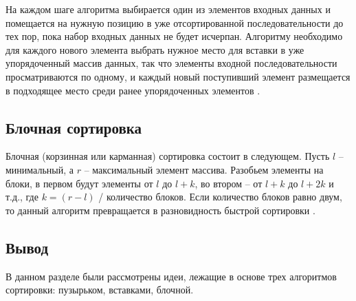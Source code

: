 На каждом  шаге  алгоритма  выбирается один  из  элементов входных данных и  помещается  на нужную  позицию  в  уже  отсортированной последовательности до тех  пор,  пока  набор  входных  данных  не будет исчерпан.  
Алгоритму  необходимо  для  каждого нового  элемента  выбрать нужное место для вставки в уже упорядоченный массив данных, так что элементы  входной  последовательности просматриваются  по одному,  и каждый новый поступивший элемент размещается  в  подходящее  место среди ранее  упорядоченных  элементов \cite{article_insert}.

\subsection{Блочная сортировка}

Блочная (корзинная или карманная) сортировка состоит в следующем. Пусть $l$ -- минимальный, а $r$ -- максимальный элемент массива. Разобьем элементы на блоки, в первом будут элементы от $l$ до $l + k$, во втором -- от $l + k$ до $l + 2k$ и т.д., где $k = (r - l)$ / количество блоков. 
Если количество блоков равно двум,
то данный алгоритм превращается в разновидность быстрой сортировки \cite{article_bucket}.


\subsection*{Вывод}

В данном разделе были рассмотрены идеи, лежащие в основе трех алгоритмов сортировки: пузырьком, вставками, блочной.